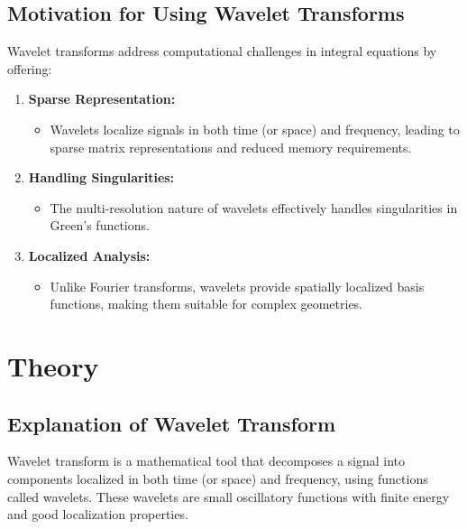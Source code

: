 \documentclass[12pt]{article}
\begin{document}
\subsection{Motivation for Using Wavelet Transforms}
Wavelet transforms address computational challenges in integral equations by offering:
\begin{enumerate}
    \item \textbf{Sparse Representation:}
          \begin{itemize}
              \item Wavelets localize signals in both time (or space) and frequency, leading to sparse matrix representations and reduced memory requirements.
          \end{itemize}
    \item \textbf{Handling Singularities:}
          \begin{itemize}
              \item The multi-resolution nature of wavelets effectively handles singularities in Green’s functions.
          \end{itemize}
    \item \textbf{Localized Analysis:}
          \begin{itemize}
              \item Unlike Fourier transforms, wavelets provide spatially localized basis functions, making them suitable for complex geometries.
          \end{itemize}
\end{enumerate}

\newpage

\section{Theory}

\subsection{Explanation of Wavelet Transform}
Wavelet transform is a mathematical tool that decomposes a signal into components localized in both time (or space) and frequency, using functions called wavelets\cite{wavelet}. These wavelets are small oscillatory functions with finite energy and good localization properties.
\end{document}

